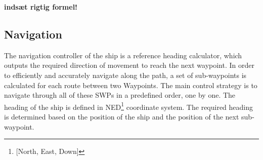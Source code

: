 \documentclass{ifacconf}
\begin{document}
\textbf{indsæt rigtig formel!}

\subsection{Navigation}

The navigation controller of the ship is a reference heading calculator, which outputs the required direction of movement to reach the next waypoint. In order to efficiently and accurately navigate along the path, a set of sub-waypoints is calculated for each route between two Waypoints. The main control strategy is to navigate through all of these SWPs in a predefined order, one by one. The heading of the ship is defined in NED\footnote[1]{[North, East, Down]} coordinate system. The required heading is determined based on the position of the ship and the position of the next sub-waypoint.
\end{document}
